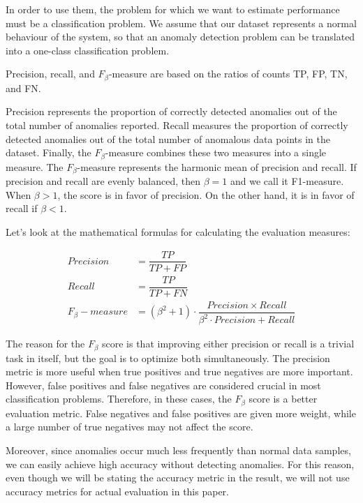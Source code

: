 In order to use them, the problem for which we want to estimate performance must be a classification problem. We assume that our dataset represents a normal behaviour of the system, so that an anomaly detection problem can be translated into a one-class classification problem. 

Precision, recall, and $F_{\beta}$-measure are based on the ratios of counts TP, FP, TN, and FN. 

Precision represents the proportion of correctly detected anomalies out of the total number of anomalies reported. Recall measures the proportion of correctly detected anomalies out of the total number of anomalous data points in the dataset. Finally, the $F_{\beta}$-measure combines these two measures into a single measure. The $F_{\beta}$-measure represents the harmonic mean of precision and recall. If precision and recall are evenly balanced, then $\beta = 1$ and we call it F1-measure. When $\beta > 1$, the score is in favor of precision. On the other hand, it is in favor of recall if $\beta < 1$. 

Let's look at the mathematical formulas for calculating the evaluation measures:

\begin{align}
    Precision &= \dfrac{TP}{TP + FP} \\
    Recall &= \dfrac{TP}{TP + FN} \\
    F_{\beta}-measure &= (\beta^2 + 1) \cdot \dfrac{Precision \times Recall }{\beta^2 \cdot Precision + Recall} 
\end{align}

The reason for the $F_{\beta}$ score is that improving either precision or recall is a trivial task in itself, but the goal is to optimize both simultaneously. The precision metric is more useful when true positives and true negatives are more important. However, false positives and false negatives are considered crucial in most classification problems. Therefore, in these cases, the $F_{\beta}$ score is a better evaluation metric. False negatives and false positives are given more weight, while a large number of true negatives may not affect the score.

Moreover, since anomalies occur much less frequently than normal data samples, we can easily achieve high accuracy without detecting anomalies. For this reason, even though we will be stating the accuracy metric in the result, we will not use accuracy metrics for actual evaluation in this paper.

